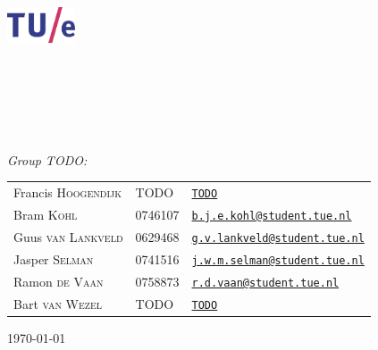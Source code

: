 \begin{titlepage}
	\begin{center}

		\includegraphics[width=0.15\textwidth]{Images/tuelogo}\\[1cm]

		\textsc{\LARGE \uni}\\[0.2cm]

		\textsc{\fase}\\[1.6cm]

        \textsc{\LARGE \vak}\\[0.5cm]

\HRule \\[0.4cm]
{ \huge \bfseries \essaytitle}\\[0.4cm]

\HRule \\[1.5cm]

	\emph{Group TODO:}\\
    \begin{tabular}{l l l}
	Francis \textsc{Hoogendijk} & TODO & \href{mailto:TODO}{\texttt{TODO}}\\
	Bram \textsc{Kohl} & 0746107 & \href{mailto:b.j.e.kohl@student.tue.nl}{\texttt{b.j.e.kohl@student.tue.nl}}\\
	Guus \textsc{van Lankveld} & 0629468 & \href{mailto:g.v.lankveld@student.tue.nl}{\texttt{g.v.lankveld@student.tue.nl}}\\
	Jasper \textsc{Selman} & 0741516 & \href{mailto:j.w.m.selman@student.tue.nl}{\texttt{j.w.m.selman@student.tue.nl}}\\
	Ramon \textsc{de Vaan} & 0758873 & \href{mailto:r.d.vaan@student.tue.nl}{\texttt{r.d.vaan@student.tue.nl}}\\
	Bart \textsc{van Wezel} & TODO & \href{mailto:r.d.vaan@student.tue.nl}{\texttt{TODO}}
    \end{tabular}
		\vfill

		{\large \today} \\
		\stad

	\end{center}
\end{titlepage} 